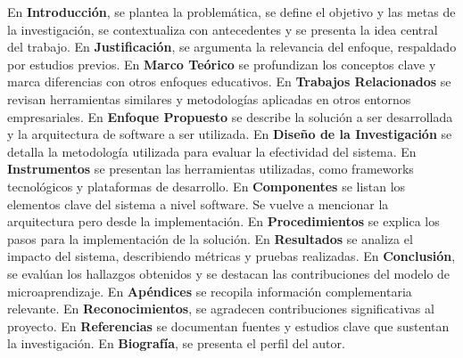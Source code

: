 En \textbf{Introducción}, se plantea la problemática, se define el objetivo y las metas de la investigación, se contextualiza con antecedentes y se presenta la idea central del trabajo.
En \textbf{Justificación}, se argumenta la relevancia del enfoque, respaldado por estudios previos.
En \textbf{Marco Teórico} se profundizan los conceptos clave y marca diferencias con otros enfoques educativos.
En \textbf{Trabajos Relacionados} se revisan herramientas similares y metodologías aplicadas en otros entornos empresariales.
En \textbf{Enfoque Propuesto} se describe la solución a ser desarrollada y la arquitectura de software a ser utilizada.
En \textbf{Diseño de la Investigación} se detalla la metodología utilizada para evaluar la efectividad del sistema.
En \textbf{Instrumentos} se presentan las herramientas utilizadas, como frameworks tecnológicos y plataformas de desarrollo.
En \textbf{Componentes} se listan los elementos clave del sistema a nivel software. Se vuelve a mencionar la arquitectura pero desde la implementación.
En \textbf{Procedimientos} se explica los pasos para la implementación de la solución.
En \textbf{Resultados} se analiza el impacto del sistema, describiendo métricas y pruebas realizadas.
En \textbf{Conclusión}, se evalúan los hallazgos obtenidos y se destacan las contribuciones del modelo de microaprendizaje.
En \textbf{Apéndices} se recopila información complementaria relevante.
En \textbf{Reconocimientos}, se agradecen contribuciones significativas al proyecto.
En \textbf{Referencias} se documentan fuentes y estudios clave que sustentan la investigación.
En \textbf{Biografía}, se presenta el perfil del autor.